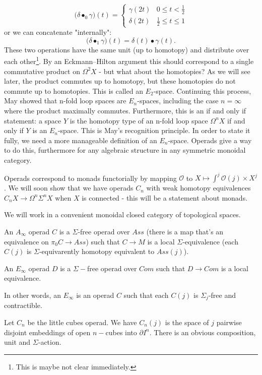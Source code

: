 $$\big(\delta\bullet_0 \gamma\big)(t)=\begin{cases} 
      \gamma(2t) & 0\leq t <\frac{1}{2} \\
      \delta(2t) & \frac{1}{2} \leq t \leq 1
   \end{cases}$$
or we can concatenate "internally":
$$\big(\delta\bullet_1 \gamma\big)(t)=\delta(t)\bullet \gamma(t).$$
These two operations have the same unit (up to homotopy) and distribute over each other\footnote{This is maybe not clear immediately.}. By an Eckmann–Hilton argument this should correspond to a single commutative product on $\Omega^2X$ - but what about the homotopies? As we will see later, the product commutes up to homotopy, but these homotopies do not commute up to homotopies. This is called an $E_2$-space. Continuing this process, May showed that n-fold loop spaces are $E_n$-spaces, including the case $n=\infty$ where the product maximally commutes. Furthermore, this is an if and only if statement: a space $Y$ is the homotopy type of an n-fold loop space $\Omega^nX$ if and only if $Y$ is an $E_n$-space. This is May's recognition principle. In order to state it fully, we need a more manageable definition of an $E_n$-space. Operads give a way to do this, furthermore for any algebraic structure in any symmetric monoidal category.

Operads correspond to monads functorially by mapping $\mathcal{O}$ to  $X\mapsto \int^j \mathcal{O}(j)\times X^j$. We will soon show that we have operads $C_n$ with weak homotopy equivalences $C_nX\rightarrow \Omega^n\Sigma^n X$ when $X$ is connected - this will be a statement about monads.

We will work in a convenient monoidal closed category of topological spaces.

\begin{definition}
    An $A_\infty$ operad $C$ is a $\Sigma$-free operad over $Ass$ (there is a map that's an equivalence on $\pi_0 C\rightarrow Ass$) such that $C\rightarrow M$ is a local $\Sigma$-equivalence (each $C(j)$ is $\Sigma$-equivarently homotopy equivalent to $Ass(j)$).

    An $E_\infty$ operad $D$ is a $\Sigma-$free operad over $Com$ such that $D\rightarrow Com$ is a local equivalence.
\end{definition}

In other words, an $E_\infty$ is an operad $C$ such that each $C(j)$ is $\Sigma_j$-free and contractible.

\begin{definition}
    Let $C_n$ be the little cubes operad. We have $C_n(j)$ is the space of $j$ pairwise disjoint embeddings of open $n-$cubes into $\partial I^n$. There is an obvious composition, unit and $\Sigma$-action. 
\end{definition}

